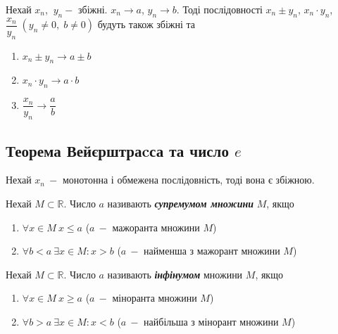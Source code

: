 \begin{theorem}
        Нехай $x_n$, $\:y_n -$ збіжні. $x_n \to a$, $y_n \to b$. Тоді послідовності $x_n \pm y_n$, $x_n \cdot y_n$, $\dfrac{x_n}{y_n} \; (y_n \neq 0, \; b \neq 0) $ будуть також збіжні та
         \begin{enumerate}
        \item $x_n \pm y_n \to a \pm b$
        \item $x_n \cdot y_n \to a \cdot b$
        \item $\dfrac{x_n}{y_n} \to \dfrac{a}{b}$
         \end{enumerate}
\end{theorem}
\subsection{\large{Теорема Вейєрштраcса та число $e$}}

\begin{theorem}
        Нехай $x_n \: -$ монотонна і обмежена послідовність, тоді вона є збіжною.
\end{theorem}

\begin{definition} 
       Нехай $M \subset \mathbb{R}$. Число $a$ називають \textcolor{NavyBlue}{{\textbf{\textit{супремумом множини}}}} $M$, якщо
        \begin{enumerate}
       \item  $\forall x \in M \ x \leqslant  a$ ($a \:- $ мажоранта множини $M$)
       \item  $\forall b < a \ \exists x \in M: x > b $ ($a \:- $ найменша з мажорант множини
       $M$)
        \end{enumerate}
\end{definition}

\begin{definition} 
       Нехай $M \subset \mathbb{R}$. Число $a$ називають \textcolor{NavyBlue}{\textbf{\textit{{інфінумом}}}} множини $M$, якщо
        \begin{enumerate}
       \item  $\forall x \in M \ x \geqslant  a$ ($a \:- $ міноранта множини $M$)
       \item  $\forall b > a \ \exists x \in M: x < b $ ($a \:- $ найбільша з мінорант множини $M$)
        \end{enumerate}
\end{definition}

